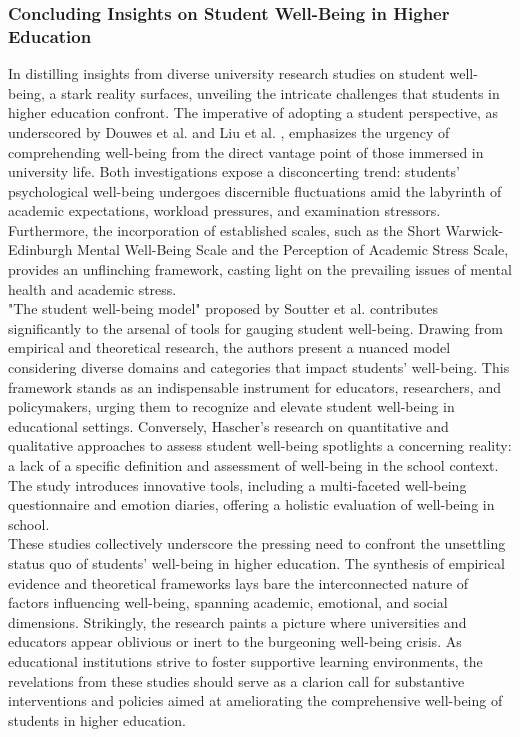 \documentclass[11pt]{report}
\begin{document}
\subsubsection{Concluding Insights on Student Well-Being in Higher Education}

In distilling insights from diverse university research studies on student well-being, a stark reality surfaces, unveiling the intricate challenges that students in higher education confront. The imperative of adopting a student perspective, as underscored by Douwes et al. \cite{research-1} and Liu et al. \cite{research-2}, emphasizes the urgency of comprehending well-being from the direct vantage point of those immersed in university life. Both investigations expose a disconcerting trend: students' psychological well-being undergoes discernible fluctuations amid the labyrinth of academic expectations, workload pressures, and examination stressors. Furthermore, the incorporation of established scales, such as the Short Warwick-Edinburgh Mental Well-Being Scale and the Perception of Academic Stress Scale, provides an unflinching framework, casting light on the prevailing issues of mental health and academic stress.
\\"The student well-being model" proposed by Soutter et al. \cite{research-3} contributes significantly to the arsenal of tools for gauging student well-being. Drawing from empirical and theoretical research, the authors present a nuanced model considering diverse domains and categories that impact students' well-being. This framework stands as an indispensable instrument for educators, researchers, and policymakers, urging them to recognize and elevate student well-being in educational settings. Conversely, Hascher's \cite{research-4} research on quantitative and qualitative approaches to assess student well-being spotlights a concerning reality: a lack of a specific definition and assessment of well-being in the school context. The study introduces innovative tools, including a multi-faceted well-being questionnaire and emotion diaries, offering a holistic evaluation of well-being in school.
\\These studies collectively underscore the pressing need to confront the unsettling status quo of students' well-being in higher education. The synthesis of empirical evidence and theoretical frameworks lays bare the interconnected nature of factors influencing well-being, spanning academic, emotional, and social dimensions. Strikingly, the research paints a picture where universities and educators appear oblivious or inert to the burgeoning well-being crisis. As educational institutions strive to foster supportive learning environments, the revelations from these studies should serve as a clarion call for substantive interventions and policies aimed at ameliorating the comprehensive well-being of students in higher education.
\end{document}

